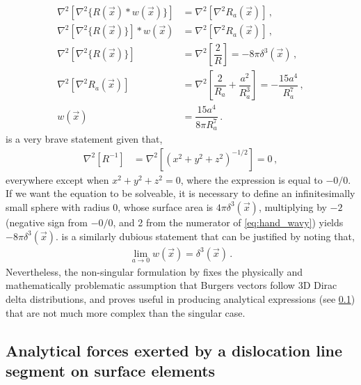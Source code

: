 \begin{subequations}
  \begin{align}
    \nabla^{2}[\nabla^{2} \{R(\vec{x}) * w(\vec{x})\} ] & = \nabla^{2}[\nabla^{2} R_{a}(\vec{x})]\,,                                                             \\
    \nabla^{2}[\nabla^{2} \{R(\vec{x})\}] * w(\vec{x})  & = \nabla^{2}[\nabla^{2} R_{a}(\vec{x})]\,,                                                             \\
    \nabla^{2}[\nabla^{2} \{R(\vec{x})\}]               & = \nabla^{2}\left[\dfrac{2}{R}\right] = -8\pi \delta^{3}(\vec{x}) \label{eq:hand_wavy}\,,              \\
    \nabla^{2}[\nabla^{2} R_{a}(\vec{x})]               & = \nabla^{2}\left[\dfrac{2}{R_{a}} + \dfrac{a^{2}}{R_{a}^{3}}\right] = -\dfrac{15 a^{4}}{R_{a}^{7}}\,, \\
    w(\vec{x})                                          & = \dfrac{15 a^{4}}{8\pi R_{a}^{7}} \label{eq:dist}\,.
  \end{align}
\end{subequations}
 is a very brave statement given that,
\begin{align}
  \nabla^{2} \left[R^{-1}\right] & = \nabla^{2}\left[(x^{2} + y^{2} + z^{2})^{-1/2}\right] = 0\,,
\end{align}
everywhere except when $x^2 + y^2 + z^2 = 0$, where the expression is equal to $-0/0$. If we want the equation to be solveable, it is necessary to define an infinitesimally small sphere with radius 0, whose surface area is $4\pi\delta^3(\vec{x})$, multiplying by $-2$ (negative sign from $-0/0$, and 2 from the numerator of \cref{eq:hand_wavy}) yields $-8\pi\delta^3(\vec{x})$.  is a similarly dubious statement that can be justified by noting that,
\begin{align}
  \lim\limits_{a\to 0} w(\vec{x}) = \delta^{3}(\vec{x})\,.
\end{align}
Nevertheless, the non-singular formulation by \citet{a_non-singular_continuum_theory_of_dislocations} fixes the physically and mathematically problematic assumption that Burgers vectors follow 3D Dirac delta distributions, and proves useful in producing analytical expressions (see \cref{ss:analytic_forces}) that are not much more complex than the singular case.

\subsection{Analytical forces exerted by a dislocation line segment on surface elements}
\label{ss:analytic_forces}


